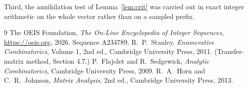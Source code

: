 \documentclass[11pt,a4paper]{article}
\theoremstyle{plain}
\theoremstyle{definition}
\begin{document}
Third, the annihilation test of Lemma~\ref{lem:crit} was carried out in exact integer
arithmetic on the whole vector rather than on a sampled prefix.

\begin{thebibliography}{9}
 The OEIS Foundation, \emph{The On-Line Encyclopedia of Integer
Sequences}, \url{https://oeis.org}, 2026. Sequence A234789.
 R.~P.~Stanley, \emph{Enumerative Combinatorics}, Volume 1, 2nd ed.,
Cambridge University Press, 2011. (Transfer-matrix method, Section 4.7.)
 P.~Flajolet and R.~Sedgewick, \emph{Analytic Combinatorics}, Cambridge
University Press, 2009.
 R.~A.~Horn and C.~R.~Johnson, \emph{Matrix Analysis}, 2nd ed., Cambridge
University Press, 2013.
\end{thebibliography}
\end{document}
